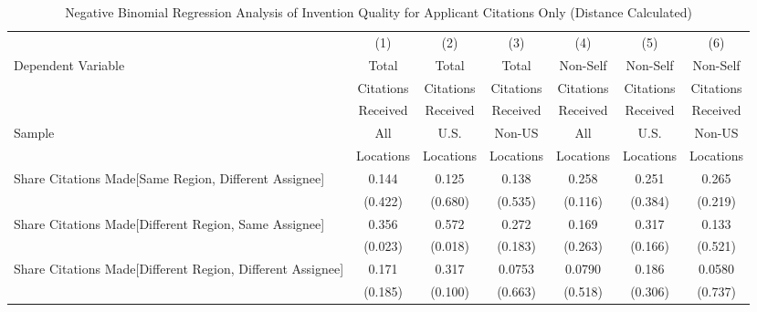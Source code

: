 \begin{table}[htbp]\centering \caption{Negative Binomial Regression Analysis of Invention Quality for Applicant Citations Only (Distance Calculated) \label{a.model123192021}} 
\begin{adjustbox}{angle=90}
\begin{tabular}{l*{6}{c}} \hline\hline
                &\multicolumn{1}{c}{(1)}&\multicolumn{1}{c}{(2)}&\multicolumn{1}{c}{(3)}&\multicolumn{1}{c}{(4)}&\multicolumn{1}{c}{(5)}&\multicolumn{1}{c}{(6)}\\
 \multirow{3}{*}{Dependent Variable} &\multicolumn{1}{c}{Total}&\multicolumn{1}{c}{Total}&\multicolumn{1}{c}{Total}&\multicolumn{1}{c}{Non-Self}&\multicolumn{1}{c}{Non-Self}&\multicolumn{1}{c}{Non-Self}\\
                &\multicolumn{1}{c}{Citations}&\multicolumn{1}{c}{Citations}&\multicolumn{1}{c}{Citations}&\multicolumn{1}{c}{Citations}&\multicolumn{1}{c}{Citations}&\multicolumn{1}{c}{Citations}\\
                 &\multicolumn{1}{c}{Received}&\multicolumn{1}{c}{Received}&\multicolumn{1}{c}{Received}&\multicolumn{1}{c}{Received}&\multicolumn{1}{c}{Received}&\multicolumn{1}{c}{Received}\\
                 \hline
 \multirow{2}{*}{Sample}&\multicolumn{1}{c}{All}&\multicolumn{1}{c}{U.S.}&\multicolumn{1}{c}{Non-US}&\multicolumn{1}{c}{All}&\multicolumn{1}{c}{U.S.}&\multicolumn{1}{c}{Non-US}\\       
  &\multicolumn{1}{c}{Locations}&\multicolumn{1}{c}{Locations}&\multicolumn{1}{c}{Locations}&\multicolumn{1}{c}{Locations}&\multicolumn{1}{c}{Locations}&\multicolumn{1}{c}{Locations}\\         
\hline
Share Citations Made[Same Region, Different Assignee]&    0.144&    0.125&    0.138&    0.258&    0.251&    0.265\\
                &  (0.422)&  (0.680)&  (0.535)&  (0.116)&  (0.384)&  (0.219)\\
Share Citations Made[Different Region, Same Assignee]&    0.356&    0.572&    0.272&    0.169&    0.317&    0.133\\
                &  (0.023)&  (0.018)&  (0.183)&  (0.263)&  (0.166)&  (0.521)\\
Share Citations Made[Different Region, Different Assignee]&    0.171&    0.317&   0.0753&   0.0790&    0.186&   0.0580\\
                &  (0.185)&  (0.100)&  (0.663)&  (0.518)&  (0.306)&  (0.737)\\

\end{tabular}
\end{adjustbox}
\end{table}
